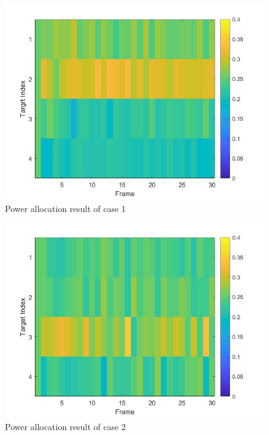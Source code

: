 \documentclass[12pt,journal,draftclsnofoot,onecolumn]{IEEEtran}
\begin{document}
\begin{figure}
	\centering
	\includegraphics[scale=0.36]{Power1.jpg}
	\caption{Power allocation result of case 1}
	\label{fig:Power 1}
\end{figure}

\begin{figure}
	\centering
	\includegraphics[scale=0.36]{Power2.jpg}
	\caption{Power allocation result of case 2}
	\label{fig:Power 2}
\end{figure}
\end{document}
